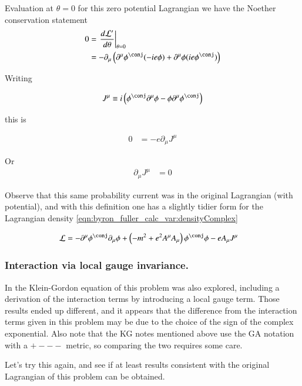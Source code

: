 Evaluation at $\theta=0$ for this zero potential Lagrangian we have the Noether conservation statement
\begin{align*}
0 
&=
\left. \frac{d\LL'}{d\theta} \right\vert_{\theta=0} \\
&=
-\partial_\mu \left( \partial^\mu \phi^\conj (-i e \phi ) + \partial^\mu \phi (i e \phi^\conj ) \right)
\end{align*}

Writing

\begin{align}
J^\mu \equiv i \left( \phi^\conj \partial^\mu \phi - \phi \partial^\mu \phi^\conj \right)
\end{align}

this is

\begin{align*}
0 &= - e \partial_\mu J^\mu
\end{align*}

Or 
\begin{align}
\partial_\mu J^\mu &= 0
\end{align}

Observe that this same probability current was in the original Lagrangian (with potential), and with this definition one has a slightly
tidier form for the Lagrangian density \ref{eqn:byron_fuller_calc_var:densityComplex}

\begin{align}\label{eqn:byron_fuller_calc_var:LagrangianWithCurrent}
\LL 
&=
-\partial^\mu \phi^\conj \partial_\mu \phi
+ \left( -m^2 + e^2 A^\mu A_\mu \right) \phi^\conj \phi
- e A_\mu J^\mu 
\end{align}

\subsubsection{Interaction via local gauge invariance. }

In  the Klein-Gordon equation of this problem was also explored, including a derivation of the interaction terms
by introducing a local gauge term.  
Those results ended up different, and it appears that the difference from the
interaction terms given in this problem may be due to the choice of the sign of the complex exponential.
Also note that the KG notes mentioned above use the GA notation with a $+---$ metric,
so comparing the two requires some care.

Let's try this again, and see if at least results consistent with the original Lagrangian of this problem can be obtained.

